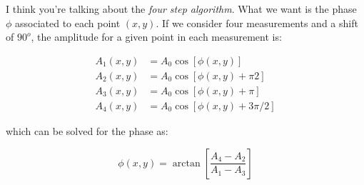 \documentclass{article}
\begin{document}
I think you're talking about the \emph{four step algorithm}. 
What we want is the phase $\phi$ associated to each point $(x,y)$. If we consider four measurements and a shift of $90^o$, the amplitude for a given point in each measurement is:

\begin{align}
A_1(x,y)&=A_0\cos[\phi(x,y)] \\
A_2(x,y)&=A_0\cos[\phi(x,y)+\pi2] \nonumber\\
A_3(x,y)&=A_0\cos[\phi(x,y)+\pi] \nonumber\\
A_4(x,y)&=A_0\cos[\phi(x,y)+3\pi/2] \nonumber
\end{align}

\noindent which can be solved for the phase as:

\begin{equation}
\phi(x,y)=\arctan\left[\frac{A_4-A_2}{A_1-A_3}\right]
\end{equation}
\end{document}
